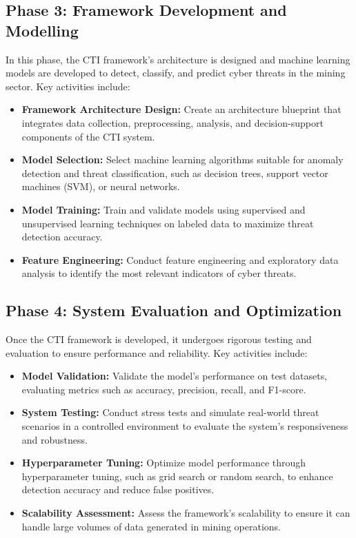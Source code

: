 \documentclass[a4paper,twoside,12pt]{report}
\begin{document}
\subsection{Phase 3: Framework Development and Modelling}  
In this phase, the CTI framework’s architecture is designed and machine learning models are developed to detect, classify, and predict cyber threats in the mining sector. Key activities include:
\begin{itemize}
    \item \textbf{Framework Architecture Design:} Create an architecture blueprint that integrates data collection, preprocessing, analysis, and decision-support components of the CTI system.
    \item \textbf{Model Selection:} Select machine learning algorithms suitable for anomaly detection and threat classification, such as decision trees, support vector machines (SVM), or neural networks.
    \item \textbf{Model Training:} Train and validate models using supervised and unsupervised learning techniques on labeled data to maximize threat detection accuracy.
    \item \textbf{Feature Engineering:} Conduct feature engineering and exploratory data analysis to identify the most relevant indicators of cyber threats.
\end{itemize}

\subsection{Phase 4: System Evaluation and Optimization}  
Once the CTI framework is developed, it undergoes rigorous testing and evaluation to ensure performance and reliability. Key activities include:
\begin{itemize}
    \item \textbf{Model Validation:} Validate the model’s performance on test datasets, evaluating metrics such as accuracy, precision, recall, and F1-score.
    \item \textbf{System Testing:} Conduct stress tests and simulate real-world threat scenarios in a controlled environment to evaluate the system’s responsiveness and robustness.
    \item \textbf{Hyperparameter Tuning:} Optimize model performance through hyperparameter tuning, such as grid search or random search, to enhance detection accuracy and reduce false positives.
    \item \textbf{Scalability Assessment:} Assess the framework’s scalability to ensure it can handle large volumes of data generated in mining operations.
\end{itemize}
\end{document}
